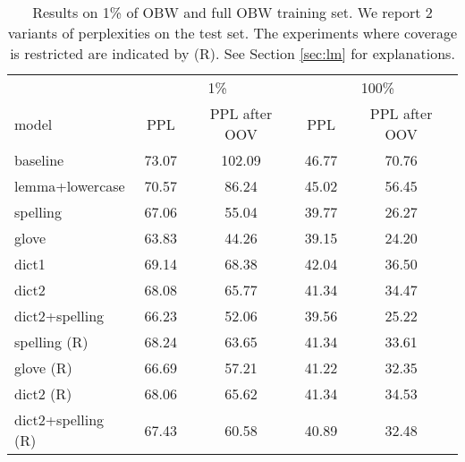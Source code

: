 \begin{table}
\caption{\label{table:obw}Results on 1\% of OBW and full OBW training set. We report 2 variants of perplexities on the test set. The experiments where coverage is restricted are indicated by (R). See Section \ref{sec:lm} for explanations.
}
    \centering
    \begin{tabular}{lcccc}
    \toprule
      & \multicolumn{2}{c}{1\%} & \multicolumn{2}{c}{100\%} \\
      model & PPL & PPL after OOV & PPL & PPL after OOV \\
    \midrule
      baseline & 73.07 & 102.09 & 46.77 & 70.76 \\
    \midrule
      lemma+lowercase & 70.57 & 86.24  & 45.02 & 56.45 \\
      spelling & 67.06 & 55.04 & 39.77 & 26.27 \\
      glove & 63.83 & 44.26 & 39.15 & 24.20 \\
      dict1 & 69.14 & 68.38 & 42.04 & 36.50 \\
      dict2 & 68.08 & 65.77 & 41.34 & 34.47 \\
      dict2+spelling & 66.23 & 52.06 & 39.56 & 25.22 \\ 
    \midrule
      spelling (R) & 68.24 & 63.65 & 41.34 & 33.61 \\
      glove (R) & 66.69 & 57.21 & 41.22 & 32.35 \\
      dict2 (R) & 68.06 & 65.62 & 41.34 & 34.53 \\
      dict2+spelling (R) & 67.43 & 60.58 & 40.89 & 32.48 \\
    \bottomrule
    \end{tabular}

\end{table}
